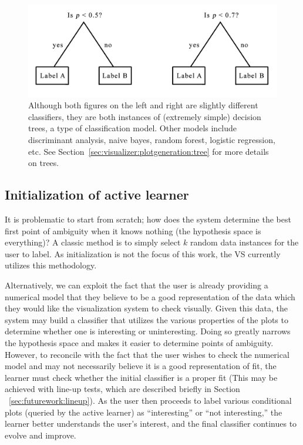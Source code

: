 \begin{figure}[htb]
	\begin{center}
		\includegraphics[width=0.75\linewidth]{ch-visualizer/figures/tree}
		\caption[Classifiers and classification models]{Although both figures 
		on the left and right are slightly different classifiers, they 
		are both instances of (extremely simple) decision trees, a type of 
		classification model. Other models include discriminant analysis, naive 
		bayes, random forest, logistic regression, etc. 
		See Section~\ref{sec:visualizer:plotgeneration:tree} for more details 
		on trees.}
		\label{fig:visualizer:al:tree}
	\end{center}
\end{figure}

\subsection{Initialization of active learner}
\label{sec:visualizer:al:initialization}

It is problematic to start from scratch; how does the system determine
the best first point of ambiguity when it knows nothing (the hypothesis space is
everything)? A classic method is to simply select $k$ random data instances for 
the user to label. As initialization is not the focus of this work, the VS 
currently utilizes this methodology.

Alternatively, we can exploit the fact that the
user is already providing a numerical model that they believe to be a good
representation of the data which they would like the visualization system to
check visually. Given this data, the system may build a classifier that utilizes
the various properties of the plots to determine whether one is interesting or
uninteresting. Doing so greatly narrows the hypothesis space and makes it easier
to determine points of ambiguity. However, to reconcile with the fact that the
user wishes to check the numerical model and may not necessarily believe it is a
good representation of fit, the learner must check whether the initial 
classifier is a proper fit (This may be achieved with line-up tests, which are 
described briefly in Section ~\ref{sec:futurework:lineup}). As the user then 
proceeds to label various conditional plots (queried by the active learner) as 
``interesting'' or ``not interesting,'' the learner better understands the
user’s interest, and the final classifier continues to evolve and improve.

